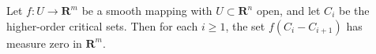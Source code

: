 Let $f: U \to \mathbf{R}^m$ be a smooth mapping with $U \subset \mathbf{R}^n$ open, and let $C_i$ be the higher-order critical sets. Then for each $i \geq 1$, the set $f(C_i - C_{i+1})$ has measure zero in $\mathbf{R}^m$.
